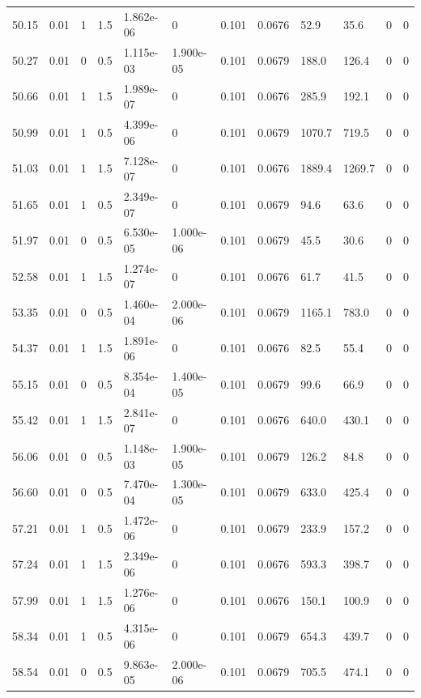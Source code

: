 \documentclass[preview]{standalone}
\begin{document}
{{{{\begin{tabular}{L{1.2cm}C{1.2cm} C{0.3cm}C{0.5cm} C{1.4cm}C{1.4cm} C{1.4cm}C{1.4cm} C{1.6cm}C{1.6cm} C{1.6cm}C{1.6cm}}
  50.15  &  0.01  & 1     & 1.5 &  1.862e-06  & 0  &  0.101&   0.0676& 52.9 & 35.6   &  0 & 0  \\ 
  50.27  &  0.01  & 0     & 0.5 &  1.115e-03  & 1.900e-05  &  0.101&   0.0679& 188.0 & 126.4   &  0 & 0  \\ 
  50.66  &  0.01  & 1     & 1.5 &  1.989e-07  & 0  &  0.101&   0.0676& 285.9 & 192.1   &  0 & 0  \\ 
  50.99  &  0.01  & 1     & 0.5 &  4.399e-06  & 0  &  0.101&   0.0679& 1070.7 & 719.5   &  0 & 0  \\ 
  51.03  &  0.01  & 1     & 1.5 &  7.128e-07  & 0  &  0.101&   0.0676& 1889.4 & 1269.7   &  0 & 0  \\ 
  51.65  &  0.01  & 1     & 0.5 &  2.349e-07  & 0  &  0.101&   0.0679& 94.6 & 63.6   &  0 & 0  \\ 
  51.97  &  0.01  & 0     & 0.5 &  6.530e-05  & 1.000e-06  &  0.101&   0.0679& 45.5 & 30.6   &  0 & 0  \\ 
  52.58  &  0.01  & 1     & 1.5 &  1.274e-07  & 0  &  0.101&   0.0676& 61.7 & 41.5   &  0 & 0  \\ 
  53.35  &  0.01  & 0     & 0.5 &  1.460e-04  & 2.000e-06  &  0.101&   0.0679& 1165.1 & 783.0   &  0 & 0  \\ 
  54.37  &  0.01  & 1     & 1.5 &  1.891e-06  & 0  &  0.101&   0.0676& 82.5 & 55.4   &  0 & 0  \\ 
  55.15  &  0.01  & 0     & 0.5 &  8.354e-04  & 1.400e-05  &  0.101&   0.0679& 99.6 & 66.9   &  0 & 0  \\ 
  55.42  &  0.01  & 1     & 1.5 &  2.841e-07  & 0  &  0.101&   0.0676& 640.0 & 430.1   &  0 & 0  \\ 
  56.06  &  0.01  & 0     & 0.5 &  1.148e-03  & 1.900e-05  &  0.101&   0.0679& 126.2 & 84.8   &  0 & 0  \\ 
  56.60  &  0.01  & 0     & 0.5 &  7.470e-04  & 1.300e-05  &  0.101&   0.0679& 633.0 & 425.4   &  0 & 0  \\ 
  57.21  &  0.01  & 1     & 0.5 &  1.472e-06  & 0  &  0.101&   0.0679& 233.9 & 157.2   &  0 & 0  \\ 
  57.24  &  0.01  & 1     & 1.5 &  2.349e-06  & 0  &  0.101&   0.0676& 593.3 & 398.7   &  0 & 0  \\ 
  57.99  &  0.01  & 1     & 1.5 &  1.276e-06  & 0  &  0.101&   0.0676& 150.1 & 100.9   &  0 & 0  \\ 
  58.34  &  0.01  & 1     & 0.5 &  4.315e-06  & 0  &  0.101&   0.0679& 654.3 & 439.7   &  0 & 0  \\ 
  58.54  &  0.01  & 0     & 0.5 &  9.863e-05  & 2.000e-06  &  0.101&   0.0679& 705.5 & 474.1   &  0 & 0  \\ 

\end{tabular}}}}}
\end{document}
